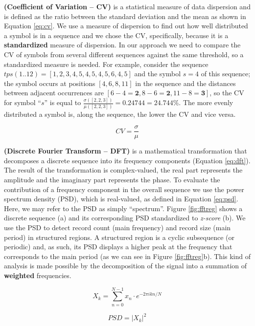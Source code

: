 \documentclass{vldb}
\begin{document}
\begin{definition}\textbf{(Coefficient of Variation -- CV)}\label{def:cv} is a
statistical measure of data dispersion and is defined as the ratio between the
standard deviation and the mean as shown in Equation
\ref{eq:cv}\cite{CVeveritt2006cambridge}. We use a measure of dispersion to find
out how well distributed a symbol is in a sequence and we chose the CV,
specifically, because it is a \textbf{standardized} measure of dispersion. In
our approach we need to compare the CV of symbols from several different
sequences against the same threshold, so a standardized measure is needed.
For example, consider the sequence $tps(1..12)=[1,2,3,4,5,4,5,4,5,6,4,5]$ and
the symbol $s=4$ of this sequence; the symbol occurs at positions $[4,6,8,11]$
in the sequence and the distances between adjacent occurrences are
$[6-4=\textbf{2},8-6=\textbf{2},11-8=\textbf{3}]$, so the CV for symbol ``$s$''
is equal to $\frac{\sigma([2, 2, 3])}{\mu([2, 2, 3])}=0.24744=24.744\%$. The
more evenly distributed a symbol is, along the sequence, the lower the CV and
vice versa.

\begin{equation}\label{eq:cv}
    CV=\frac{\sigma}{\mu}
\end{equation}
\end{definition}

\begin{definition}\textbf{(Discrete Fourier Transform -- DFT)}\label{def:dft} is
a mathematical transformation that decomposes a discrete sequence into its frequency components
(Equation \ref{eq:dft}). The result of the transformation is complex-valued, the
real part represents the amplitude and the imaginary part represents the phase.
To evaluate the contribution of a frequency component in the overall sequence we
use the power spectrum density (PSD), which is real-valued, as defined in
Equation \ref{eq:psd}. Here, we may refer to the PSD as simply ``spectrum''.
Figure \ref{fig:fftreg} shows a discrete sequence (a) and its corresponding PSD
standardized to \textit{z-score} (b). We use the PSD to detect record count
(main frequency) and record size (main period) in structured regions. A
structured region is a cyclic subsequence (or periodic) and, as such, its PSD
displays a higher peak at the frequency that corresponds to the main period (as
we can see in Figure \ref{fig:fftreg}b). This kind of analysis is made possible
by the decomposition of the signal into a summation of \textbf{weighted}
frequencies.

\begin{equation}\label{eq:dft}
    X_k=\sum_{n=0}^{N-1}{x_n\cdot e^{-2\pi ikn/N}}    
\end{equation}

\begin{equation}\label{eq:psd}
    PSD=|X_k|^2
\end{equation}

\end{definition}
\end{document}
